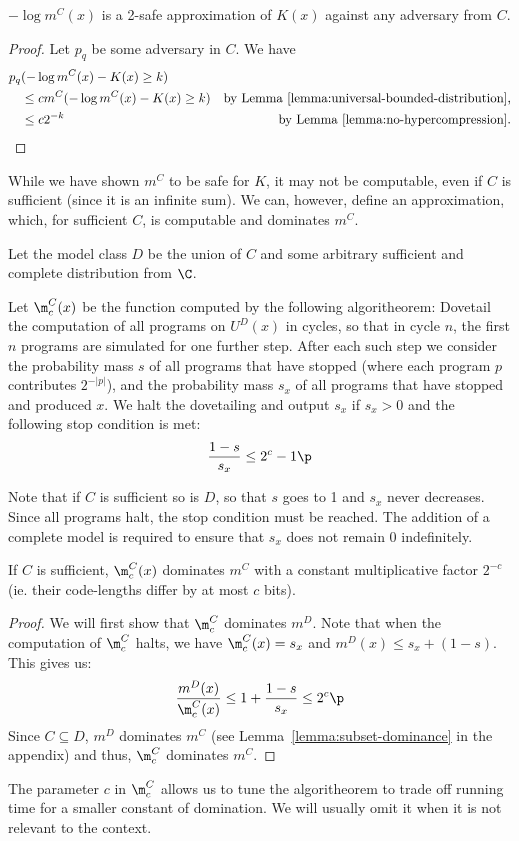 \renewcommand*{\thefootnote}{\arabic{footnote}}

\begin{theorem}
$-\log m^C(x)$ is a 2-safe approximation of $K(x)$ against any adversary from $C$.
\label{theorem:safe}
\end{theorem}
\begin{proof}\belowdisplayskip=-12pt
Let $p_q$ be some adversary in $C$. We have 
\begin{align*}
p_q&(-\log m^C(x) - K(x) \geq k) \\ 
&\leq c m^C(-\log m^C(x) - K(x) \geq k) &\text{by Lemma~\ref{lemma:universal-bounded-distribution},} \\
&\leq c 2^{-k} &\text{by Lemma~\ref{lemma:no-hypercompression}.}
\end{align*}
\end{proof}
While we have shown $m^C$ to be safe for $K$, it may not be computable, even if $C$ is sufficient (since it is an infinite sum). We can, however, define an approximation, which, for sufficient $C$, is computable and dominates $m^C$.

\begin{definition}
\label{definition:algoritheorem}
Let the model class $D$ be the union of $C$ and some arbitrary sufficient and complete distribution from $\C$.

Let $\m^C_c(x)$ be the function computed by the following algoritheorem:
Dovetail the computation of all programs on $U^D(x)$ in cycles, so that in cycle $n$, the first $n$ programs are simulated for one further step. After each such step we consider the probability mass $s$ of all programs that have stopped (where each program $p$ contributes $2^{-|p|}$), and the probability mass $s_x$ of all programs that have stopped and produced $x$. We halt the dovetailing and output $s_x$ if $s_x > 0$ and the following stop condition is met:
\[
\frac{1-s}{s_x} \leq 2^c - 1 \p
\] 
\end{definition}
Note that if $C$ is sufficient so is $D$, so that $s$ goes to 1 and $s_x$ never decreases.  Since all programs halt, the stop condition must be reached. The addition of a complete model is required to ensure that $s_x$ does not remain $0$ indefinitely.

\begin{lemma}
If $C$ is sufficient, $\m^C_c(x)$ dominates $m^C$ with a constant multiplicative factor $2^{-c}$ (ie. their code-lengths differ by at most $c$ bits).
\label{lemma:overline-dominance}
\end{lemma}
\begin{proof}\belowdisplayskip=-12pt
We will first show that $\m^C_c$ dominates $m^D$. Note that when the computation of $\m^C_c$ halts, we have $\m^C_c(x) = s_x$ and $m^D(x) \leq s_x + (1 - s)$. This gives us:
\[
\frac{m^D(x)}{\m^C_c(x)} \leq 1 + \frac{1 - s}{s_x} \leq 2^{c} \p
\]
Since $C \subseteq D$, $m^D$ dominates $m^C$ (see Lemma~\ref{lemma:subset-dominance} in the appendix) and thus, $\m^C_c$ dominates $m^C$.
\end{proof}
The parameter $c$ in $\m^C_c$ allows us to tune the algoritheorem to trade off running time for a smaller constant of domination. We will usually omit it when it is not relevant to the context. 


